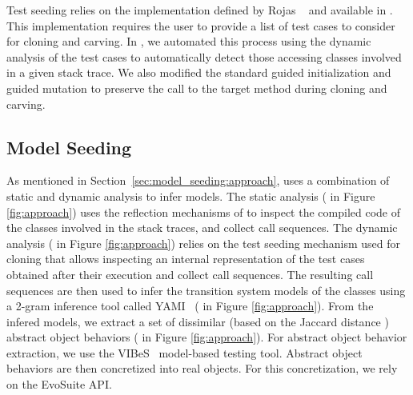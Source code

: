 Test seeding relies on the implementation defined by Rojas \etal~\cite{Rojas2016} and available in \evosuite. This implementation requires the user to provide a list of test cases to consider for cloning and carving. In \botsing, we automated this process using the dynamic analysis of the test cases to automatically detect those accessing classes involved in a given stack trace. We also modified the standard guided initialization and guided mutation to preserve the call to the target method during cloning and carving.

\subsection{Model Seeding}

As mentioned in Section~\ref{sec:model_seeding:approach}, \botsing uses a combination of static and dynamic analysis to infer models. The static analysis ( in Figure \ref{fig:approach}) uses the reflection mechanisms of \evosuite to inspect the compiled code of the classes involved in the stack traces, and collect call sequences. The dynamic analysis ( in Figure \ref{fig:approach}) relies on the test seeding mechanism used for cloning that allows inspecting an internal representation of the test cases obtained after their execution and collect call sequences.
%
The resulting call sequences are then used to infer the transition system models of the classes using a 2-gram inference tool called YAMI~\cite{Devroey2017b} ( in Figure \ref{fig:approach}).
From the infered models, we extract a set of dissimilar (based on the Jaccard distance \cite{Jaccard1901}) abstract object behaviors ( in Figure \ref{fig:approach}). For abstract object behavior extraction, we use the VIBeS~\cite{Devroey2016} model-based testing tool.
%
Abstract object behaviors are then concretized into real objects. For this concretization, we rely on the EvoSuite API.


